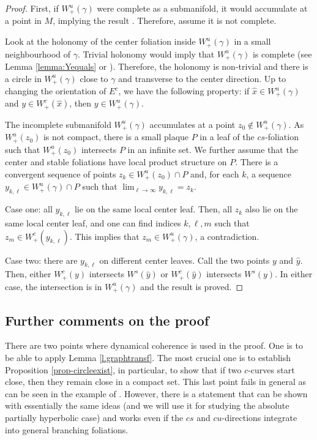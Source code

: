 \documentclass[11pt]{amsart} %
\newcommand{\Ec}{E^c}
\newcommand{\Ws}{W^s}
\newcommand{\Wup}{W^u_+}
\newcommand{\Wcp}{W^c_+}
\numberwithin{equation}{section}
\theoremstyle{remark}
\begin{document}
\begin{proof}
    First, if $\Wup(\gamma)$ were complete as a submanifold,
    it would accumulate at a point in $M$, implying the result .
    Therefore, assume it is not complete.

    Look at the holonomy of the center foliation inside $\Wup(\gamma)$
    in a small neighbourhood of $\gamma$.
    Trivial holonomy would imply that $\Wup(\gamma)$ is complete (see Lemma \ref{lemma:Yequals} or \cite{BonattiWilkinson}).
    Therefore, the holonomy is non-trivial and there is a circle
    in $\Wup(\gamma)$ close to $\gamma$ and transverse to the center direction.
    Up to changing the orientation of $\Ec$, we have the following
    property{:}
    if $\hat x \in \Wup(\gamma)$ and $y \in \Wcp(\hat x)$,
    then $y \in \Wup(\gamma)$.

    
    The incomplete submanifold $\Wup(\gamma)$ accumulates
    at a point $z_0 \notin \Wup(\gamma)$.
    As $\Wup(z_0)$ is not compact, there is a small plaque $P$ in a leaf of the $cs$-foliation
    such that $\Wup(z_0)$ intersects $P$
    in an infinite set.
    We further assume that the center and stable foliations have
    local product structure on $P$.
    There is a convergent sequence of points
    $z_k \in \Wup(z_0) \cap P$
    and, for each $k$, a sequence $y_{k,\ell} \in \Wup(\gamma) \cap P$
    such that $\lim_{\ell \to \infty} y_{k,\ell} = z_k$.

    Case one{:}
    all $y_{k,\ell}$ lie on the same local center leaf.
    Then, all $z_k$ also lie on the same local center leaf, and one can find
    indices $k,\ell,m$ such that $z_m \in \Wcp(y_{k,\ell})$.
    This implies that $z_m \in \Wup(\gamma)$, a contradiction.

    Case two{:}
    there are $y_{k,\ell}$ on different center leaves.
    Call the two points $y$ and $\hat y$.
    Then, either
    $\Wcp(y)$ intersects $\Ws(\hat y)$
    or
    $\Wcp(\hat y)$ intersects $\Ws(y)$.
    In either case, the intersection is in $\Wup(\gamma)$
    and the result is proved.
\end{proof}
 
 
 
 
\subsection{Further comments on the proof}\label{ss.furthercomments} 
There are two points where dynamical coherence is used in the proof. One is to be able to apply Lemma \ref{l.graphtransf}. The most crucial one is to establish Proposition \ref{prop-circleexist}, in particular, to show that if two $c$-curves start close, then they remain close in a compact set. This last point fails in general as can be seen in the example of \cite{HHU-example}. However, there is a statement that can be shown with essentially the same ideas (and we will use it for studying the absolute partially hyperbolic case) and works even if the $cs$ and $cu$-directions integrate into general branching foliations.
\end{document}

